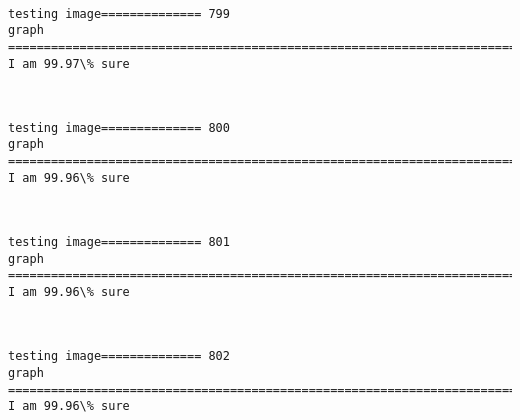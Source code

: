 \documentclass[11pt]{article}
\begin{document}
    \begin{center}
    \end{center}
    { \hspace*{\fill} \\}
    
    \begin{Verbatim}[commandchars=\\\{\}]
testing image============== 799
graph
============================================================================
I am 99.97\% sure

    \end{Verbatim}

    \begin{center}
    \end{center}
    { \hspace*{\fill} \\}
    
    \begin{Verbatim}[commandchars=\\\{\}]
testing image============== 800
graph
============================================================================
I am 99.96\% sure

    \end{Verbatim}

    \begin{center}
    \end{center}
    { \hspace*{\fill} \\}
    
    \begin{Verbatim}[commandchars=\\\{\}]
testing image============== 801
graph
============================================================================
I am 99.96\% sure

    \end{Verbatim}

    \begin{center}
    \end{center}
    { \hspace*{\fill} \\}
    
    \begin{Verbatim}[commandchars=\\\{\}]
testing image============== 802
graph
============================================================================
I am 99.96\% sure

    \end{Verbatim}
\end{document}
